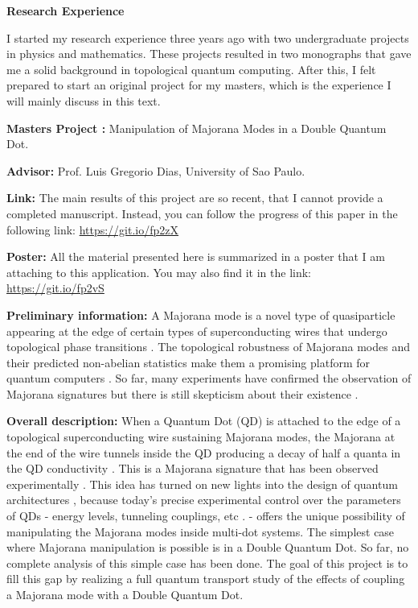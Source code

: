 
{\LARGE \noindent  \textbf{Research Experience}}

\vspace{3mm}

\noindent I started my research experience three years ago with two undergraduate projects in physics and mathematics. These projects resulted in two monographs that gave me a solid background in topological quantum computing. After this, I felt prepared to start an original project for my masters, which is the experience I will mainly discuss in this text.   

\noindent \textbf{Masters Project :}  Manipulation of Majorana Modes in a Double Quantum Dot.

\noindent \textbf{Advisor:} Prof. Luis Gregorio Dias, University of Sao Paulo.

\noindent \textbf{Link:}	The main results of this project are so recent, that I cannot provide a completed manuscript. Instead, you can follow the progress of this paper in the following link: \url{https://git.io/fp2zX}

\noindent \textbf{Poster:} All the material presented here is summarized in a poster that I am attaching to this application. You may also find it in the link: \url{https://git.io/fp2vS} 

\noindent \textbf{Preliminary information:} A Majorana mode is a novel type of quasiparticle appearing at the edge of certain types of superconducting wires that undergo topological phase transitions \cite{kitaev_unpaired_2001}. The topological robustness of Majorana modes and their predicted non-abelian statistics make them a promising platform for quantum computers \cite{alicea_majorana_2010,alicea_new_2012,sarma_majorana_2015,lutchyn_majorana_2010}. So far, many experiments have confirmed the observation of Majorana signatures  but there is still skepticism about their existence \cite{mourik_signatures_2012,das_zero-bias_2012,deng_anomalous_2012,zhang_quantized_2018}.

\noindent \textbf{Overall description: }When a Quantum Dot (QD) is attached to the edge of a topological superconducting wire sustaining Majorana modes, the Majorana at the end of the wire tunnels inside the QD producing a decay of half a quanta in the QD conductivity \cite{liu_detecting_2011,vernek_subtle_2014,ruiz-tijerina_interaction_2015,lee_kondo_2013} . This is a Majorana signature that has been observed experimentally \cite{deng_majorana_2016}. This idea has turned on new lights into the design of quantum architectures \cite{karzig_scalable_2017}, because today’s precise experimental control over the parameters of QDs - energy levels, tunneling couplings, etc . - offers the unique possibility of manipulating the Majorana modes inside multi-dot systems. The simplest case where Majorana manipulation is possible is in a Double Quantum Dot. So far, no complete analysis of this simple case has been done. The goal of this  project is to fill this gap by realizing a full quantum transport study of the effects of coupling a Majorana mode with a Double Quantum Dot. 

